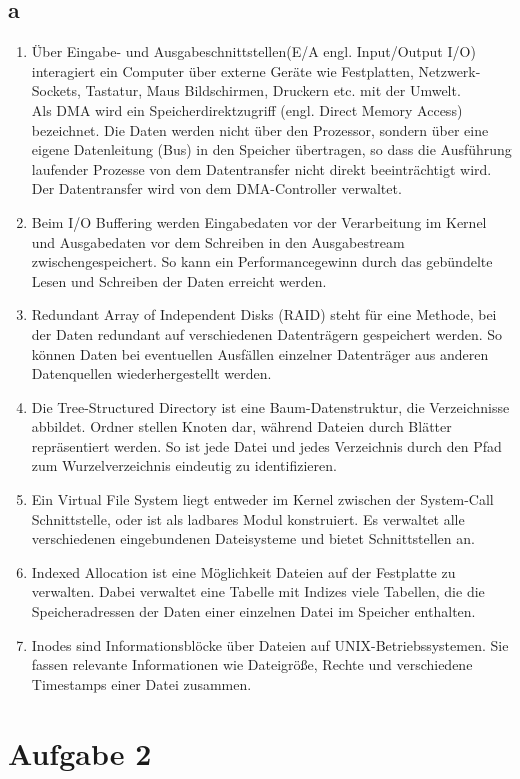 \documentclass[numbers=noendperiod]{scrartcl}
\begin{document}
\subsection*{a}
\begin{enumerate}
	\item Über Eingabe- und Ausgabeschnittstellen(E/A engl. Input/Output I/O) interagiert ein Computer über externe Geräte wie Festplatten, Netzwerk-Sockets, Tastatur, Maus Bildschirmen, Druckern etc. mit der Umwelt.\\
	Als DMA wird ein Speicherdirektzugriff (engl. Direct Memory Access) bezeichnet. Die Daten werden nicht über den Prozessor, sondern über eine eigene Datenleitung (Bus) in den Speicher übertragen, so dass die Ausführung laufender Prozesse von dem Datentransfer nicht direkt beeinträchtigt wird. Der Datentransfer wird von dem DMA-Controller verwaltet.
	\item Beim I/O Buffering werden Eingabedaten vor der Verarbeitung im Kernel und Ausgabedaten vor dem Schreiben in den Ausgabestream zwischengespeichert. So kann ein Performancegewinn durch das gebündelte Lesen und Schreiben der Daten erreicht werden.  
	\item Redundant Array of Independent Disks (RAID) steht für eine Methode, bei der Daten redundant auf verschiedenen Datenträgern gespeichert werden. So können Daten bei eventuellen Ausfällen einzelner Datenträger aus anderen Datenquellen wiederhergestellt werden. 
	\item Die Tree-Structured Directory ist eine Baum-Datenstruktur, die Verzeichnisse abbildet. Ordner stellen Knoten dar, während Dateien durch Blätter repräsentiert werden. So ist jede Datei und jedes Verzeichnis durch den Pfad zum Wurzelverzeichnis eindeutig zu identifizieren.
	\item Ein Virtual File System liegt entweder im Kernel zwischen der System-Call Schnittstelle, oder ist als ladbares Modul konstruiert. Es verwaltet alle verschiedenen eingebundenen Dateisysteme und bietet Schnittstellen an.  
	\item Indexed Allocation ist eine Möglichkeit Dateien auf der Festplatte zu verwalten. Dabei verwaltet eine Tabelle mit Indizes viele Tabellen, die die Speicheradressen der Daten einer einzelnen Datei im Speicher enthalten.
	\item Inodes sind Informationsblöcke über Dateien auf UNIX-Betriebssystemen. Sie fassen relevante Informationen wie Dateigröße, Rechte und verschiedene Timestamps einer Datei zusammen.
	 
	   
\end{enumerate}
\section*{Aufgabe 2}


\end{document}
